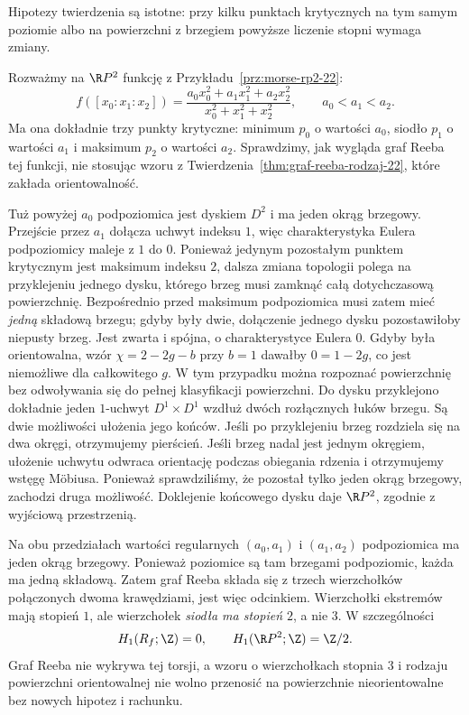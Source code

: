 Hipotezy twierdzenia są istotne: przy kilku punktach
krytycznych na tym samym poziomie albo na powierzchni
z brzegiem powyższe liczenie stopni wymaga zmiany.

\begin{przyklad}
\label{prz:reeb-rp2-siodlo-stopien-dwa-18}
Rozważmy na $\R P^2$ funkcję z
Przykładu~\ref{prz:morse-rp2-22}:
\[
 f([x_0:x_1:x_2])=
 \frac{a_0x_0^2+a_1x_1^2+a_2x_2^2}
      {x_0^2+x_1^2+x_2^2},\qquad a_0<a_1<a_2.
\]
Ma ona dokładnie trzy punkty krytyczne: minimum $p_0$
o wartości $a_0$, siodło $p_1$ o wartości $a_1$
i maksimum $p_2$ o wartości $a_2$.
Sprawdzimy, jak wygląda graf Reeba tej funkcji,
nie stosując wzoru z
Twierdzenia~\ref{thm:graf-reeba-rodzaj-22},
które zakłada orientowalność.

Tuż powyżej $a_0$ podpoziomica jest dyskiem $D^2$
i ma jeden okrąg brzegowy. Przejście przez $a_1$
dołącza uchwyt indeksu $1$, więc charakterystyka Eulera
podpoziomicy maleje z $1$ do $0$.
Ponieważ jedynym pozostałym punktem krytycznym jest
maksimum indeksu $2$, dalsza zmiana topologii
polega na przyklejeniu jednego dysku, którego
brzeg musi zamknąć całą dotychczasową powierzchnię.
Bezpośrednio przed maksimum podpoziomica musi zatem
mieć \emph{jedną} składową brzegu; gdyby były dwie,
dołączenie jednego dysku pozostawiłoby niepusty brzeg.
Jest zwarta i spójna, o charakterystyce Eulera $0$.
Gdyby była orientowalna, wzór
$\chi=2-2g-b$ przy $b=1$ dawałby
$0=1-2g$, co jest niemożliwe dla całkowitego $g$.
W tym przypadku można rozpoznać powierzchnię bez
odwoływania się do pełnej klasyfikacji powierzchni.
Do dysku przyklejono dokładnie jeden $1$-uchwyt
$D^1\times D^1$ wzdłuż dwóch rozłącznych łuków brzegu.
Są dwie możliwości ułożenia jego końców.
Jeśli po przyklejeniu brzeg rozdziela się na dwa okręgi,
otrzymujemy pierścień. Jeśli brzeg nadal jest jednym
okręgiem, ułożenie uchwytu odwraca orientację podczas
obiegania rdzenia i otrzymujemy wstęgę Möbiusa.
Ponieważ sprawdziliśmy, że pozostał tylko jeden
okrąg brzegowy, zachodzi druga możliwość.
Doklejenie końcowego dysku daje $\R P^2$,
zgodnie z wyjściową przestrzenią.

Na obu przedziałach wartości regularnych
$(a_0,a_1)$ i $(a_1,a_2)$ podpoziomica ma jeden
okrąg brzegowy. Ponieważ poziomice są tam
brzegami podpoziomic, każda ma jedną składową.
Zatem graf Reeba składa się z trzech wierzchołków
połączonych dwoma krawędziami, jest więc odcinkiem.
Wierzchołki ekstremów mają stopień $1$,
ale wierzchołek \emph{siodła ma stopień $2$},
a nie $3$. W szczególności
\[
 H_1(R_f;\Z)=0,\qquad
 H_1(\R P^2;\Z)=\Z/2.
\]
Graf Reeba nie wykrywa tej torsji, a wzoru
o wierzchołkach stopnia $3$ i rodzaju powierzchni
orientowalnej nie wolno przenosić na powierzchnie
nieorientowalne bez nowych hipotez i rachunku.
\end{przyklad}

